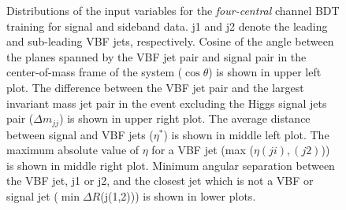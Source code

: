 \documentclass[PAPER, american,coverpage,texlive=2016, english]{\ATLASLATEXPATH atlasdoc}
\begin{document}
\begin{figure}[htbp]
  \caption{Distributions of the input variables for the \textit{four-central} channel BDT training for signal and sideband data. j1 and j2 denote the leading \pT{} and sub-leading \pT{} VBF jets, respectively.  Cosine of the angle between the planes spanned by the VBF jet pair and signal pair in the center-of-mass frame of the  system ($\cos{\theta}$) is shown in upper left plot.  The difference between the VBF jet pair and the largest invariant mass jet pair in the event excluding the Higgs signal jets pair ($\Delta m_{jj}$) is shown in upper right plot.  The average distance between signal and VBF jets ($\eta^{*}$) is shown in middle left plot.  The maximum absolute value of $\eta$ for a VBF jet (max ($\eta(ji),(j2)$)) is shown in middle right plot.   Minimum angular separation between the VBF jet, j1 or j2,  and the closest jet which is not a VBF or signal jet ($\min\Delta R$(j(1,2))) is shown in lower plots.}
  \label{fig:bdtvar4cen1}
\end{figure}
\end{document}
